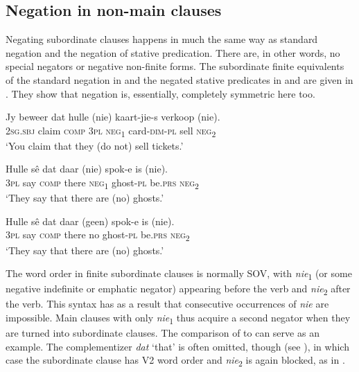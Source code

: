 \documentclass[output=paper,colorlinks,citecolor=brown]{langscibook}
\begin{document}
\subsection{Negation in non-main clauses}
\label{sec:afr:2.4}
Negating subordinate clauses happens in much the same way as standard negation and the negation of stative predication. There are, in other words, no special negators or negative non-finite forms. The subordinate finite equivalents of the standard negation in  and the negated stative predicates in  and  are given in . They show that negation is, essentially, completely symmetric here too.

\ea\label{ex:afr:19}
    \ea\label{ex:afr:19a}
        \gll Jy beweer dat hulle (nie) kaart-jie-s verkoop (nie). \\ 
             \textsc{2sg.sbj} claim \textsc{comp} \textsc{3pl} \textsc{neg}\textsubscript{1}  card-\textsc{dim-pl} sell    \textsc{neg}\textsubscript{2} \\
        \glt ‘You claim that they (do not) sell tickets.’
    
    \ex\label{ex:afr:19b}
        \gll Hulle sê dat daar (nie) spok-e is (nie). \\
             3\textsc{pl} say \textsc{comp} there  \textsc{neg}\textsubscript{1} ghost-\textsc{pl} be.\textsc{prs} \textsc{neg}\textsubscript{2}\\
        \glt ‘They say that there are (no) ghosts.’

    \ex\label{ex:afr:19c}
        \gll Hulle sê dat daar (geen) spok-e is (nie). \\
             3\textsc{pl} say \textsc{comp} there no ghost-\textsc{pl} be.\textsc{prs} \textsc{neg}\textsubscript{2}\\
        \glt ‘They say that there are (no) ghosts.’
    \z
\z 


The word order in finite subordinate clauses is normally SOV, with \textit{nie}\textsubscript{1} (or some negative indefinite or emphatic negator) appearing before the verb and \textit{nie}\textsubscript{2} after the verb. This syntax has as a result that consecutive occurrences of \textit{nie} are impossible. Main clauses with only \textit{nie}\textsubscript{1} thus acquire a second negator when they are turned into subordinate clauses. The comparison of  to  can serve as an example. The complementizer \textit{dat} ‘that’ is often omitted, though (see \citealt{RooyKruger2016}), in which case the subordinate clause has V2 word order and \textit{nie}\textsubscript{2} is again blocked, as in . 
\end{document}
